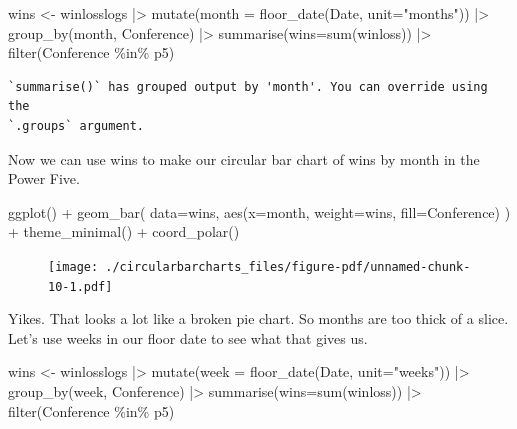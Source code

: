 \documentclass[
  letterpaper,
  DIV=11,
  numbers=noendperiod]{scrreprt}
\newenvironment{Shaded}{\begin{snugshade}}{\end{snugshade}}
\newcommand{\AttributeTok}[1]{\textcolor[rgb]{0.40,0.45,0.13}{#1}}
\newcommand{\FunctionTok}[1]{\textcolor[rgb]{0.28,0.35,0.67}{#1}}
\newcommand{\NormalTok}[1]{\textcolor[rgb]{0.00,0.23,0.31}{#1}}
\newcommand{\OtherTok}[1]{\textcolor[rgb]{0.00,0.23,0.31}{#1}}
\newcommand{\SpecialCharTok}[1]{\textcolor[rgb]{0.37,0.37,0.37}{#1}}
\newcommand{\StringTok}[1]{\textcolor[rgb]{0.13,0.47,0.30}{#1}}
\begin{document}
\begin{Shaded}
\begin{Highlighting}[]
\NormalTok{wins }\OtherTok{\textless{}{-}}\NormalTok{ winlosslogs }\SpecialCharTok{|\textgreater{}} 
  \FunctionTok{mutate}\NormalTok{(}\AttributeTok{month =} \FunctionTok{floor\_date}\NormalTok{(Date, }\AttributeTok{unit=}\StringTok{"months"}\NormalTok{)) }\SpecialCharTok{|\textgreater{}} 
  \FunctionTok{group\_by}\NormalTok{(month, Conference) }\SpecialCharTok{|\textgreater{}} 
  \FunctionTok{summarise}\NormalTok{(}\AttributeTok{wins=}\FunctionTok{sum}\NormalTok{(winloss)) }\SpecialCharTok{|\textgreater{}} 
  \FunctionTok{filter}\NormalTok{(Conference }\SpecialCharTok{\%in\%}\NormalTok{ p5) }
\end{Highlighting}
\end{Shaded}

\begin{verbatim}
`summarise()` has grouped output by 'month'. You can override using the
`.groups` argument.
\end{verbatim}

Now we can use wins to make our circular bar chart of wins by month in
the Power Five.

\begin{Shaded}
\begin{Highlighting}[]
\FunctionTok{ggplot}\NormalTok{() }\SpecialCharTok{+} 
  \FunctionTok{geom\_bar}\NormalTok{(}
    \AttributeTok{data=}\NormalTok{wins, }
    \FunctionTok{aes}\NormalTok{(}\AttributeTok{x=}\NormalTok{month, }\AttributeTok{weight=}\NormalTok{wins, }\AttributeTok{fill=}\NormalTok{Conference)}
\NormalTok{    ) }\SpecialCharTok{+} 
  \FunctionTok{theme\_minimal}\NormalTok{() }\SpecialCharTok{+} 
  \FunctionTok{coord\_polar}\NormalTok{()}
\end{Highlighting}
\end{Shaded}

\begin{figure}[H]

{\centering \texttt{[image: ./circularbarcharts\_files/figure-pdf/unnamed-chunk-10-1.pdf]}

}

\end{figure}

Yikes. That looks a lot like a broken pie chart. So months are too thick
of a slice. Let's use weeks in our floor date to see what that gives us.

\begin{Shaded}
\begin{Highlighting}[]
\NormalTok{wins }\OtherTok{\textless{}{-}}\NormalTok{ winlosslogs }\SpecialCharTok{|\textgreater{}} 
  \FunctionTok{mutate}\NormalTok{(}\AttributeTok{week =} \FunctionTok{floor\_date}\NormalTok{(Date, }\AttributeTok{unit=}\StringTok{"weeks"}\NormalTok{)) }\SpecialCharTok{|\textgreater{}} 
  \FunctionTok{group\_by}\NormalTok{(week, Conference) }\SpecialCharTok{|\textgreater{}} 
  \FunctionTok{summarise}\NormalTok{(}\AttributeTok{wins=}\FunctionTok{sum}\NormalTok{(winloss)) }\SpecialCharTok{|\textgreater{}} 
  \FunctionTok{filter}\NormalTok{(Conference }\SpecialCharTok{\%in\%}\NormalTok{ p5) }
\end{Highlighting}
\end{Shaded}
\end{document}
